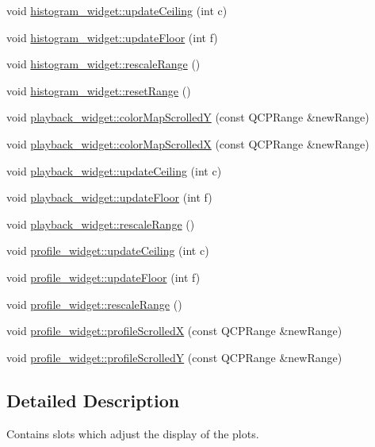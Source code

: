 \begin{DoxyCompactItemize}
\item 
void \hyperlink{group__plotfunc_ga2a4bb2a69816bf4370bf6e8bb6a917ad}{histogram\+\_\+widget\+::update\+Ceiling} (int c)
\item 
void \hyperlink{group__plotfunc_gaebb6be44eb733ec6b1a5e46ad38071c6}{histogram\+\_\+widget\+::update\+Floor} (int f)
\item 
void \hyperlink{group__plotfunc_gab1d2aa3969a6455b12d8d630d8a271b4}{histogram\+\_\+widget\+::rescale\+Range} ()
\item 
void \hyperlink{group__plotfunc_ga2e72b7c626e51d26af1cae0f1199d3e1}{histogram\+\_\+widget\+::reset\+Range} ()
\item 
void \hyperlink{group__plotfunc_gac31ae6a43fc74935f3464cc745ddd295}{playback\+\_\+widget\+::color\+Map\+Scrolled\+Y} (const Q\+C\+P\+Range \&new\+Range)
\item 
void \hyperlink{group__plotfunc_gac8bc93f4d7ac6c29990147f901ce21f9}{playback\+\_\+widget\+::color\+Map\+Scrolled\+X} (const Q\+C\+P\+Range \&new\+Range)
\item 
void \hyperlink{group__plotfunc_ga69e639dbe803f1a6ce375e6669c7299c}{playback\+\_\+widget\+::update\+Ceiling} (int c)
\item 
void \hyperlink{group__plotfunc_ga4289b12c3b445a24b0c70a4d38f3eff4}{playback\+\_\+widget\+::update\+Floor} (int f)
\item 
void \hyperlink{group__plotfunc_gabe98b74caa29f3d46d1061b87dd6490f}{playback\+\_\+widget\+::rescale\+Range} ()
\item 
void \hyperlink{group__plotfunc_ga6a4cd513b932ef5d1c6e8e2ddb0dd2c8}{profile\+\_\+widget\+::update\+Ceiling} (int c)
\item 
void \hyperlink{group__plotfunc_ga59aa2ce4533f4134b5e63d30d7d246a5}{profile\+\_\+widget\+::update\+Floor} (int f)
\item 
void \hyperlink{group__plotfunc_ga13e4eef45eecd7d2d5fc04da4e70ab73}{profile\+\_\+widget\+::rescale\+Range} ()
\item 
void \hyperlink{group__plotfunc_gaae1d5bdfda189bdb6b6063f0ea68848c}{profile\+\_\+widget\+::profile\+Scrolled\+X} (const Q\+C\+P\+Range \&new\+Range)
\item 
void \hyperlink{group__plotfunc_gab6fe48d4a076233b021907d07d637bae}{profile\+\_\+widget\+::profile\+Scrolled\+Y} (const Q\+C\+P\+Range \&new\+Range)
\end{DoxyCompactItemize}


\subsection{Detailed Description}
Contains slots which adjust the display of the plots. 

